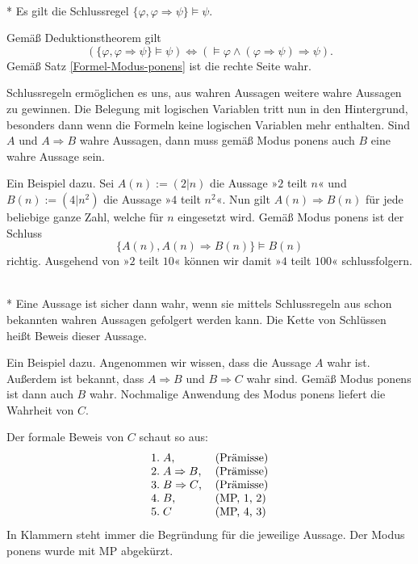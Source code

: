 \begin{Satz}\mbox{}\\*
Es gilt die Schlussregel $\{\varphi,\varphi\Rightarrow\psi\}\models\psi$.
\end{Satz}
 Gemäß Deduktionstheorem gilt
\[(\{\varphi,\varphi\Rightarrow\psi\}\models\psi)
\iff (\models \varphi\land(\varphi\Rightarrow\psi)\Rightarrow\psi).\]
Gemäß Satz \ref{Formel-Modus-ponens} ist die rechte
Seite wahr.\;\qedsymbol

Schlussregeln ermöglichen es uns, aus wahren Aussagen weitere
wahre Aussagen zu gewinnen. Die Belegung mit logischen Variablen
tritt nun in den Hintergrund, besonders dann wenn die Formeln keine
logischen Variablen mehr enthalten. Sind $A$ und $A\Rightarrow B$
wahre Aussagen, dann muss gemäß Modus ponens auch $B$ eine wahre
Aussage sein.

Ein Beispiel dazu. Sei $A(n):=(2|n)$ die Aussage »$2$ teilt $n$«
und $B(n):=(4|n^2)$ die Aussage »$4$ teilt $n^2$«.
Nun gilt $A(n)\Rightarrow B(n)$ für jede beliebige ganze
Zahl, welche für $n$ eingesetzt wird. Gemäß Modus ponens ist der Schluss%
\[\{A(n), A(n)\Rightarrow B(n)\}\models B(n)\]
richtig. Ausgehend von »$2$ teilt $10$« können wir
damit »$4$ teilt $100$« schlussfolgern.

\begin{Definition}[Beweis]\mbox{}\\*
Eine Aussage ist sicher dann wahr, wenn sie mittels Schlussregeln
aus schon bekannten wahren Aussagen gefolgert werden kann. Die Kette
von Schlüssen heißt Beweis dieser Aussage.
\end{Definition}
Ein Beispiel dazu. Angenommen wir wissen, dass die Aussage $A$ wahr
ist. Außerdem ist bekannt, dass $A\Rightarrow B$ und $B\Rightarrow C$
wahr sind. Gemäß Modus ponens ist dann auch $B$ wahr. Nochmalige
Anwendung des Modus ponens liefert die Wahrheit von $C$.

Der formale Beweis von $C$ schaut so aus:
\[
\begin{tabular}{ll}
1.\;$A$, & (Prämisse)\\
2.\;$A\Rightarrow B$, & (Prämisse)\\
3.\;$B\Rightarrow C$, & (Prämisse)\\
4.\;$B$, & (MP, 1, 2)\\
5.\;$C$ & (MP, 4, 3)
\end{tabular}
\]
In Klammern steht immer die Begründung für die jeweilige Aussage.
Der Modus ponens wurde mit MP abgekürzt.

